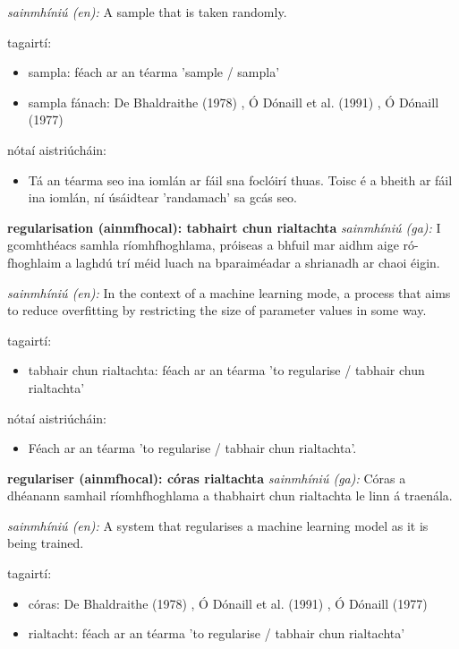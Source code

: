 \documentclass{article}
\begin{document}
\textit{sainmhíniú (en):} A sample that is taken randomly.

tagairtí:
\begin{itemize}
	\item sampla: féach ar an téarma 'sample / sampla'
	\item sampla fánach: De Bhaldraithe (1978) \cite{de-bhaldraithe}, Ó Dónaill et al. (1991) \cite{focloir-beag}, Ó Dónaill (1977) \cite{odonaill}
\end{itemize}

nótaí aistriúcháin:
\begin{itemize}
	\item Tá an téarma seo ina iomlán ar fáil sna foclóirí thuas. Toisc é a bheith ar fáil ina iomlán, ní úsáidtear 'randamach' sa gcás seo.
\end{itemize}


\textbf{regularisation (ainmfhocal): tabhairt chun rialtachta}
\textit{sainmhíniú (ga):} I gcomhthéacs samhla ríomhfhoghlama, próiseas a bhfuil mar aidhm aige ró-fhoghlaim a laghdú trí méid luach na bparaiméadar a shrianadh ar chaoi éigin.

\textit{sainmhíniú (en):} In the context of a machine learning mode, a process that aims to reduce overfitting by restricting the size of parameter values in some way.

tagairtí:
\begin{itemize}
	\item tabhair chun rialtachta: féach ar an téarma 'to regularise / tabhair chun rialtachta'
\end{itemize}

nótaí aistriúcháin:
\begin{itemize}
	\item Féach ar an téarma 'to regularise / tabhair chun rialtachta'.
\end{itemize}


\textbf{regulariser (ainmfhocal): córas rialtachta}
\textit{sainmhíniú (ga):} Córas a dhéanann samhail ríomhfhoghlama a thabhairt chun rialtachta le linn á traenála.

\textit{sainmhíniú (en):} A system that regularises a machine learning model as it is being trained.

tagairtí:
\begin{itemize}
	\item córas: De Bhaldraithe (1978) \cite{de-bhaldraithe}, Ó Dónaill et al. (1991) \cite{focloir-beag}, Ó Dónaill (1977) \cite{odonaill}
	\item rialtacht: féach ar an téarma 'to regularise / tabhair chun rialtachta'
\end{itemize}
\end{document}
